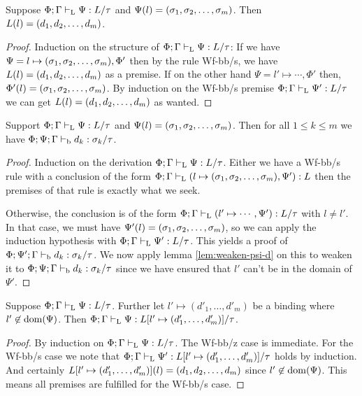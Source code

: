 \documentclass[a4paper, oneside, 10pt, draft]{memoir}
\begin{document}
\begin{lem}
  \label{lem:tpbb-lookup}
  Suppose $\Phi;\Gamma |-_{\mathrm{L}} \Psi : L / \tau$ and $\Psi(l) =
  (\sigma_1, \sigma_2, \dotsc, \sigma_m)$. Then $L(l) = (d_1, d_2, \dotsc, d_m)$.
\end{lem}
\begin{proof}
  Induction on the structure of $\Phi;\Gamma |-_{\mathrm{L}} \Psi : L / \tau$:
  If we have $\Psi = l \mapsto (\sigma_1, \sigma_2, \dotsc, \sigma_m), \Phi'$ then by the rule Wf-bb/s, we
  have $L(l) = (d_1, d_2, \dotsc, d_m)$ as a premise. If on the other hand $\Psi = l'
  \mapsto \dotsb, \Phi'$ then, $\Phi'(l) = (\sigma_1, \sigma_2, \dotsc, \sigma_m)$. By induction on
  the Wf-bb/s premise $\Phi;\Gamma |-_{\mathrm{L}} \Psi' : L / \tau$ we can get $L(l) =
  (d_1, d_2, \dotsc, d_m)$ as wanted.
\end{proof}

\begin{lem}
  \label{lem:preservation-lookup}
  Support $\Phi;\Gamma |-_{\mathrm{L}} \Psi : L / \tau$ and $\Psi(l) =
  (\sigma_1, \sigma_2, \dotsc, \sigma_m)$. Then for all $1 \leq k \leq m$ we have $\Phi;\Psi;\Gamma
  |-_{\mathrm{b}} d_k : \sigma_k / \tau$.
\end{lem}
\begin{proof}
  Induction on the derivation $\Phi;\Gamma |-_{\mathrm{L}} \Psi : L /
  \tau$. Either we have a Wf-bb/s rule with a conclusion of the form
  $\Phi;\Gamma |-_{\mathrm{L}} (l \mapsto (\sigma_1, \sigma_2, \dotsc, \sigma_m), \Psi') : L$ then the
  premises of that rule is exactly what we seek.

  Otherwise, the conclusion is of the form $\Phi;\Gamma |-_{\mathrm{L}} (l'
  \mapsto \dotsb, \Psi') : L/\tau$ with $l \neq l'$. In that case, we must have
  $\Psi'(l) = (\sigma_1, \sigma_2, \dotsc, \sigma_m)$, so we can apply the induction hypothesis with
  $\Phi;\Gamma |-_{\mathrm{L}} \Psi' : L / \tau$. This yields a proof of
  $\Phi;\Psi';\Gamma |-_{\mathrm{b}} d_k : \sigma_k / \tau$. We now apply lemma
  \ref{lem:weaken-psi-d} on this to weaken it to $\Phi;\Psi;\Gamma
  |-_{\mathrm{b}} d_k : \sigma_k / \tau$ since we have ensured that $l'$ can't be
  in the domain of $\Psi'$.
\end{proof}

\newcommand{\dbundlep}{(d'_1, \dotsc, d'_m)}
\begin{lem}
  \label{lem:tpbb-weaken-l}
  Suppose $\Phi;\Gamma |-_{\mathrm{L}} \Psi : L / \tau$. Further let $l' \mapsto
  \dbundlep$ be a binding where $l' \not \in \mathrm{dom}(\Psi)$. Then
  $\Phi;\Gamma \tpbb \Psi : L[l' \mapsto \dbundlep] / \tau$.
\end{lem}
\begin{proof}
  By induction on $\Phi;\Gamma |-_{\mathrm{L}} \Psi : L / \tau$. The Wf-bb/z
  case is immediate. For the Wf-bb/s case we note that $\Phi;\Gamma
  \tpbb \Psi' : L[l' \mapsto \dbundlep] / \tau$ holds by
  induction. And certainly $L[l' \mapsto \dbundlep](l) = \dbundle$
  since $l' \not \in \mathrm{dom}(\Psi)$. This means all premises are
  fulfilled for the Wf-bb/s case.
\end{proof}
\end{document}
